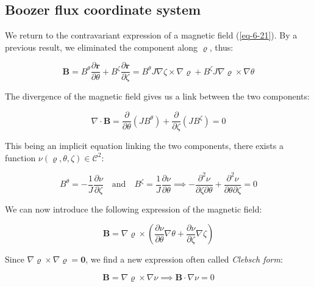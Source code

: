 \subsection{Boozer flux coordinate system}

\label{subsec-5-5-1}

We return to the contravariant expression of a magnetic field (\ref{eq-6-21}). By a previous result, we eliminated the component along $\varrho$, thus:

\begin{equation}
    \label{eq-6-41}
    \mathbf{B}=B^\theta\frac{\partial\mathbf{r}}{\partial\theta}+B^\zeta\frac{\partial\mathbf{r}}{\partial\zeta}=B^\theta J\nabla\zeta\times\nabla\varrho+B^\zeta J\nabla\varrho\times\nabla\theta
\end{equation}

The divergence of the magnetic field gives us a link between the two components:

\begin{equation}
    \label{eq-6-42}
    \nabla\cdot\mathbf{B}=\frac{\partial}{\partial\theta}(JB^\theta)+\frac{\partial}{\partial\zeta}(JB^\zeta)=0
\end{equation}

This being an implicit equation linking the two components, there exists a function $\nu(\varrho, \theta, \zeta)\in \mathcal{C}^2$:

\begin{equation}
    \label{eq-5-45}
    B^\theta=-\frac{1}{J}\frac{\partial\nu}{\partial\zeta}\quad\text{and}\quad B^\zeta=\frac{1}{J}\frac{\partial\nu}{\partial\theta}\implies-\frac{\partial^2\nu}{\partial\zeta\partial\theta}+\frac{\partial^2\nu}{\partial\theta\partial\zeta}=0
\end{equation}

We can now introduce the following expression of the magnetic field:

\begin{equation}
    \label{eq-6-44}
    \mathbf{B}=\nabla\varrho\times\left(\frac{\partial\nu}{\partial\theta}\nabla\theta+\frac{\partial\nu}{\partial\zeta}\nabla\zeta\right)
\end{equation}

Since $\nabla\varrho\times\nabla\varrho=\mathbf{0}$, we find a new expression often called \textit{Clebsch form}:

\begin{equation}
    \label{eq-clebsch-form}
    \mathbf{B}=\nabla\varrho\times\nabla\nu\implies\mathbf{B}\cdot\nabla\nu=0
\end{equation}

